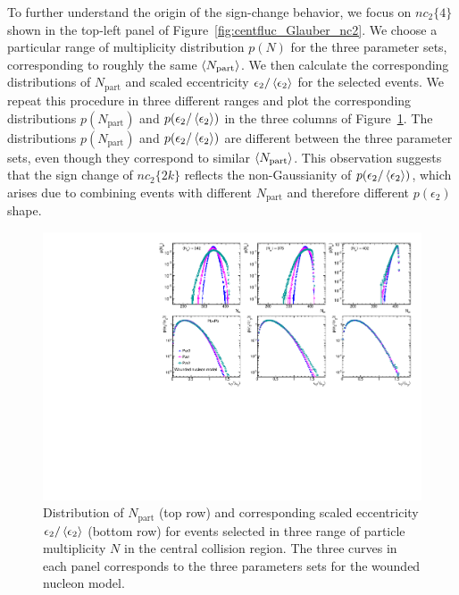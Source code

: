 To further understand the origin of the sign-change behavior, we focus on $nc_2\{4\}$ shown in the top-left panel of Figure~\ref{fig:centfluc_Glauber_nc2}. We choose a particular range of multiplicity distribution $p(N)$ for the three parameter sets, corresponding to roughly the same $\left\langle N_\text{part}\right\rangle$. We then calculate the corresponding distributions of $N_\text{part}$ and scaled eccentricity $\epsilon_2 / \left\langle \epsilon_2\right\rangle$ for the selected events. We repeat this procedure in three different ranges and plot the corresponding distributions $p(N_\text{part})$ and $p(\epsilon_2 / \left\langle \epsilon_2\right\rangle)$ in the three columns of Figure~\ref{fig:centfluc_Glauber_ecc}. The distributions $p(N_\text{part})$ and $p(\epsilon_2 / \left\langle \epsilon_2\right\rangle)$ are different between the three parameter sets, even though they correspond to similar $\left\langle N_\text{part}\right\rangle$. This observation suggests that the sign change of $nc_2\{2k\}$ reflects the non-Gaussianity of $p(\epsilon_2 / \left\langle \epsilon_2\right\rangle)$, which arises due to combining events with different $N_\text{part}$ and therefore different $p(\epsilon_2)$ shape.

\begin{figure}[H]
\centering
\includegraphics[width=.95\linewidth]{figs/chapter_centfluc/Glauber_ecc.pdf}
\caption{Distribution of $N_\text{part}$ (top row) and corresponding scaled eccentricity $\epsilon_2/\left\langle \epsilon_2\right\rangle$ (bottom row) for events selected in three range of particle multiplicity $N$ in the central collision region. The three curves in each panel corresponds to the three parameters sets for the wounded nucleon model.}
\label{fig:centfluc_Glauber_ecc}
\end{figure}

